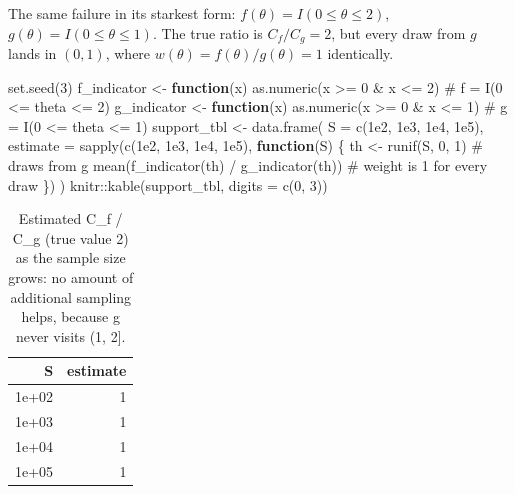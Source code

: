 \documentclass[
  letterpaper,
  DIV=11,
  numbers=noendperiod]{scrreprt}
\newenvironment{Shaded}{\begin{snugshade}}{\end{snugshade}}
\newcommand{\AttributeTok}[1]{\textcolor[rgb]{0.40,0.45,0.13}{#1}}
\newcommand{\CommentTok}[1]{\textcolor[rgb]{0.37,0.37,0.37}{#1}}
\newcommand{\ControlFlowTok}[1]{\textcolor[rgb]{0.00,0.23,0.31}{\textbf{#1}}}
\newcommand{\DecValTok}[1]{\textcolor[rgb]{0.68,0.00,0.00}{#1}}
\newcommand{\FloatTok}[1]{\textcolor[rgb]{0.68,0.00,0.00}{#1}}
\newcommand{\FunctionTok}[1]{\textcolor[rgb]{0.28,0.35,0.67}{#1}}
\newcommand{\NormalTok}[1]{\textcolor[rgb]{0.00,0.23,0.31}{#1}}
\newcommand{\OtherTok}[1]{\textcolor[rgb]{0.00,0.23,0.31}{#1}}
\newcommand{\SpecialCharTok}[1]{\textcolor[rgb]{0.37,0.37,0.37}{#1}}
\begin{document}
The same failure in its starkest form:
\(f(\theta) = I(0\le\theta\le2)\), \(g(\theta) = I(0\le\theta\le1)\).
The true ratio is \(C_f/C_g = 2\), but every draw from \(g\) lands in
\((0,1)\), where \(w(\theta)=f(\theta)/g(\theta)=1\) identically.

\begin{Shaded}
\begin{Highlighting}[]
\FunctionTok{set.seed}\NormalTok{(}\DecValTok{3}\NormalTok{)}
\NormalTok{f\_indicator }\OtherTok{\textless{}{-}} \ControlFlowTok{function}\NormalTok{(x) }\FunctionTok{as.numeric}\NormalTok{(x }\SpecialCharTok{\textgreater{}=} \DecValTok{0} \SpecialCharTok{\&}\NormalTok{ x }\SpecialCharTok{\textless{}=} \DecValTok{2}\NormalTok{)   }\CommentTok{\# f = I(0 \textless{}= theta \textless{}= 2)}
\NormalTok{g\_indicator }\OtherTok{\textless{}{-}} \ControlFlowTok{function}\NormalTok{(x) }\FunctionTok{as.numeric}\NormalTok{(x }\SpecialCharTok{\textgreater{}=} \DecValTok{0} \SpecialCharTok{\&}\NormalTok{ x }\SpecialCharTok{\textless{}=} \DecValTok{1}\NormalTok{)   }\CommentTok{\# g = I(0 \textless{}= theta \textless{}= 1)}
\NormalTok{support\_tbl }\OtherTok{\textless{}{-}} \FunctionTok{data.frame}\NormalTok{(}
    \AttributeTok{S =} \FunctionTok{c}\NormalTok{(}\FloatTok{1e2}\NormalTok{, }\FloatTok{1e3}\NormalTok{, }\FloatTok{1e4}\NormalTok{, }\FloatTok{1e5}\NormalTok{),}
    \AttributeTok{estimate =} \FunctionTok{sapply}\NormalTok{(}\FunctionTok{c}\NormalTok{(}\FloatTok{1e2}\NormalTok{, }\FloatTok{1e3}\NormalTok{, }\FloatTok{1e4}\NormalTok{, }\FloatTok{1e5}\NormalTok{), }\ControlFlowTok{function}\NormalTok{(S) \{}
\NormalTok{        th }\OtherTok{\textless{}{-}} \FunctionTok{runif}\NormalTok{(S, }\DecValTok{0}\NormalTok{, }\DecValTok{1}\NormalTok{)                              }\CommentTok{\# draws from g}
        \FunctionTok{mean}\NormalTok{(}\FunctionTok{f\_indicator}\NormalTok{(th) }\SpecialCharTok{/} \FunctionTok{g\_indicator}\NormalTok{(th))            }\CommentTok{\# weight is 1 for every draw}
\NormalTok{    \})}
\NormalTok{)}
\NormalTok{knitr}\SpecialCharTok{::}\FunctionTok{kable}\NormalTok{(support\_tbl, }\AttributeTok{digits =} \FunctionTok{c}\NormalTok{(}\DecValTok{0}\NormalTok{, }\DecValTok{3}\NormalTok{))}
\end{Highlighting}
\end{Shaded}

{

\begin{longtable}[]{@{}rr@{}}

\caption{\label{tbl-support-violation}Estimated C\_f / C\_g (true value
2) as the sample size grows: no amount of additional sampling helps,
because g never visits (1, 2{]}.}

\tabularnewline

\toprule\noalign{}
S & estimate \\
\midrule\noalign{}
\endhead
\bottomrule\noalign{}
\endlastfoot
1e+02 & 1 \\
1e+03 & 1 \\
1e+04 & 1 \\
1e+05 & 1 \\

\end{longtable}

}
\end{document}
